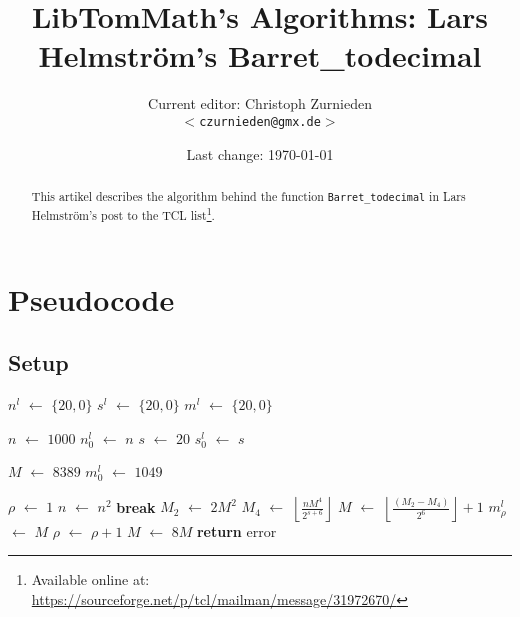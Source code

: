 \documentclass[a4paper,10pt]{article}
\newcommand*\Let[2]{\State #1 $\gets$ #2}
\newcommand{\RETURN}{\State \textbf{return} }
\newcommand{\Break}{\State \textbf{break} }
\providecommand{\floor}[1]{\left\lfloor#1\right\rfloor}
\providecommand{\ceil}[1]{\left\lceil#1\right\rceil}
\theoremstyle{plain} %
\theoremstyle{definition}
\theoremstyle{remark}
\newcommand*{\smalltt}[1]{\small\texttt{#1}}
\begin{document}
\title{LibTomMath's Algorithms: Lars Helmstr\"om's Barret\_todecimal}
\author{Current editor: Christoph Zurnieden\\
        \small{\texttt{$<$czurnieden@gmx.de$>$}}}
\date{Last change: \today}
\maketitle

\renewcommand{\ttdefault}{pcr}

\begin{abstract}
This artikel describes the algorithm behind the function \smalltt{Barret\_todecimal} in Lars Helmstr\"om's post to the TCL list\footnote{Available online at: \url{https://sourceforge.net/p/tcl/mailman/message/31972670/}}.
\end{abstract}

\section{Pseudocode}

\subsection{Setup}
\begin{center}
  \begin{algorithmic}[1]
      \Let{$n^l$}{$\{20,0\}$}
      \Let{$s^l$}{$\{20,0\}$}
      \Let{$m^l$}{$\{20,0\}$}

      \Let{$n$}{$1000$}
      \Let{$n^l_0$}{$n$}
      \Let{$s$}{$20$}
      \Let{$s^l_0$}{$s$}

      \Let{$M$}{$8389$}\Comment{$\ceil{ \left(8 * 2^20\right)/1000}$}
      \Let{$m^l_0$}{$1049$}\Comment{$\ceil{M/8}$}

      \Let{$\rho$}{$1$}
        \Let{$n$}{$n^2$}
           \Break
        \EndIf
        \CommentInlineMulti{Compute $M = \ceil{\left(2^{2s}\right)/n^2}$}
        \Let{$M_2$}{$2M^2$}
        \Let{$M_4$}{$\floor{\frac{nM^4}{2^{s + 6}}}$}
        \Let{$M$}{$\floor{\frac{\left(M_2 - M_4\right)}{2^6}} + 1$}
        \Let{$m^l_\rho$}{$M$}
        \Let{$\rho$}{$\rho + 1$}
        \Let{$M$}{$8M$}
      \EndWhile
         \RETURN error
      \EndIf
      \State {}
    \EndFunction
  \end{algorithmic}
\end{center}
\end{document}

